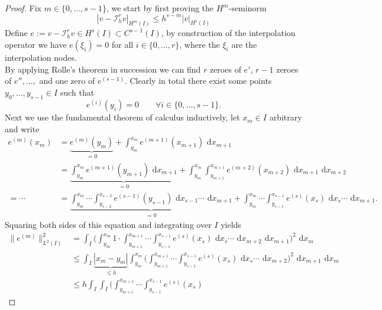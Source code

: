 \begin{proof}

		Fix $m \in \{0,\ldots,s-1\}$, we start by first proving the $H^m$-seminorm
		\begin{equation}
			\label{eq:proof_polynomial_interpolation_approx_estimate_seminorm}
			| v - \mathcal{I}_h^r v |_{H^m(I)} \leq h^{s-m} |v|_{H^s(I)}
		\end{equation} 
		Define $e := v - \mathcal{I}_h^r v \in H^s(I) \subset C^{s-1}(I)$, by construction of the interpolation operator we have $e(\xi_i) = 0$ for 
		all $i \in \{0,\ldots,r\}$, where the $\xi_i$ are the interpolation nodes. \\
		By applying Rolle's theorem in succession we can find $r$ zeroes of $e'$, $r-1$ zeroes of $e''$$,\ldots,$ and one zero of $e^{(s-1)}$.
		Clearly in total there exist some points $y_0,\ldots,y_{s-1} \in I$ such that 
		\begin{equation*}
			e^{(i)}(y_i) = 0 \qquad \forall i \in \{0,\ldots,s-1\}.
		\end{equation*} 
		Next we use the fundamental theorem of calculus inductively, let $x_m \in I$ arbitrary and write
		\begin{align*}
			e^{(m)}(x_m) &= \underbrace{e^{(m)}(y_m)}_{=0} + \int_{y_m}^{x_m} e^{(m+1)}(x_{m+1}) \text{ d}x_{m+1} \\
			&= \underbrace{\int_{y_m}^{x_m} e^{(m+1)}(y_{m+1}) \text{ d}x_{m+1}}_{=0} 
			+\int_{y_m}^{x_m} \int_{y_{m+1}}^{x_{m+1}} e^{(m+2)}(x_{m+2}) \text{ d}x_{m+1} \text{ d}x_{m+2} \\
			= \cdots &= \underbrace{\int_{y_m}^{x_m}\cdots \int_{y_{s-2}}^{x_{s-2}} e^{(s-1)}(y_{s-1}) \text{ d}x_{s-1} \cdots \text{ d}x_{m+1}}_{=0}
			+ \int_{y_m}^{x_m}\cdots \int_{y_{s-1}}^{x_{s-1}} e^{(s)}(x_{s}) \text{ d}x_{s} \cdots \text{ d}x_{m+1}.
		\end{align*}
		Squaring both sides of this equation and integrating over $I$ yields
		\begin{align*}
			\| e^{(m)} \|_{L^2(I)}^2 &= 
			\int_{I} \Big(\int_{y_m}^{x_m}1 \cdot \int_{y_{m+1}}^{x_{m+1}}\cdots \int_{y_{s-1}}^{x_{s-1}} e^{(s)}(x_{s}) 
			\text{ d}x_{s} \cdots \text{ d}x_{m+2} \text{ d}x_{m+1}\Big)^2 \text{ d}x_{m} \\
			& \leq \int_{I} \underbrace{|x_{m} - y_{m} |}_{\leq h} \int_{y_m}^{x_m} \Big(\int_{y_{m+1}}^{x_{m+1}}\cdots \int_{y_{s-1}}^{x_{s-1}} e^{(s)}(x_{s}) 
			\text{ d}x_{s} \cdots \text{ d}x_{m+2} \Big)^2 \text{ d}x_{m+1} \text{ d}x_{m} \\
			& \leq h \int_{I}  \int_{I} \Big(\int_{y_{m+1}}^{x_{m+1}}\cdots \int_{y_{s-1}}^{x_{s-1}} e^{(s)}(x_{s}) 

\end{align*}$$
\end{proof}
